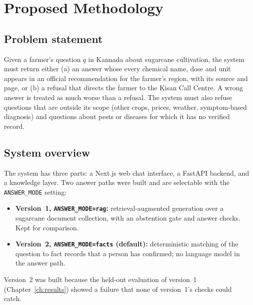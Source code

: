\chapter{Proposed Methodology}
\label{ch:method}

\section{Problem statement}
Given a farmer's question $q$ in Kannada about sugarcane cultivation, the system must
return either (a) an answer whose every chemical name, dose and unit appears in an
official recommendation for the farmer's region, with its source and page, or (b) a
refusal that directs the farmer to the Kisan Call Centre. A wrong answer is treated as
much worse than a refusal. The system must also refuse questions that are outside its
scope (other crops, prices, weather, symptom-based diagnosis) and questions about pests
or diseases for which it has no verified record.

\section{System overview}
The system has three parts: a Next.js web chat interface, a FastAPI backend, and a
knowledge layer. Two answer paths were built and are selectable with the
\texttt{ANSWER\_MODE} setting:
\begin{itemize}
  \item \textbf{Version~1, \texttt{ANSWER\_MODE=rag}:} retrieval-augmented generation over a
    sugarcane document collection, with an abstention gate and answer checks. Kept for
    comparison.
  \item \textbf{Version~2, \texttt{ANSWER\_MODE=facts} (default):} deterministic matching of the
    question to fact records that a person has confirmed; no language model in the
    answer path.
\end{itemize}
Version~2 was built because the held-out evaluation of version~1 (Chapter~\ref{ch:results})
showed a failure that none of version~1's checks could catch.

